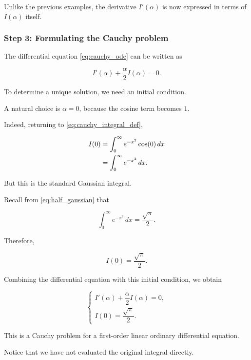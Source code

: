 \documentclass[11pt,a4paper]{article}
\theoremstyle{definition}
\theoremstyle{remark}
\begin{document}
Unlike the previous examples,
the derivative $I'(\alpha)$
is now expressed in terms
of $I(\alpha)$ itself.

\subsubsection*{Step 3: Formulating
the Cauchy problem}

The differential equation
\eqref{eq:cauchy_ode}
can be written as

\begin{equation}
    I'(\alpha)
    +
    \frac{\alpha}{2}I(\alpha)=0.
\end{equation}

To determine a unique solution,
we need an initial condition.

A natural choice is
$\alpha=0$, because the
cosine term becomes $1$.

Indeed, returning to
\eqref{eq:cauchy_integral_def},

\begin{align}
    I(0)
    &=
    \int_0^\infty
    e^{-x^2}\cos(0)\,dx
    \notag\\
    &=
    \int_0^\infty e^{-x^2}\,dx.
\end{align}

But this is the standard
Gaussian integral.

Recall from
\eqref{eq:half_gaussian}
that

\[
    \int_0^\infty e^{-x^2}\,dx
    =
    \frac{\sqrt{\pi}}{2}.
\]

Therefore,

\begin{equation}
    \boxed{
    I(0)=\frac{\sqrt{\pi}}{2}.
    }
    \label{eq:cauchy_initial_condition}
\end{equation}

Combining the differential
equation with this initial
condition, we obtain

\begin{equation}
    \boxed{
    \begin{cases}
    I'(\alpha)+\dfrac{\alpha}{2}I(\alpha)=0,
    \\[8pt]
    I(0)=\dfrac{\sqrt{\pi}}{2}.
    \end{cases}
    }
    \label{eq:cauchy_ivp}
\end{equation}

This is a Cauchy problem
for a first-order linear
ordinary differential equation.

Notice that we have
not evaluated the original
integral directly.
\end{document}
